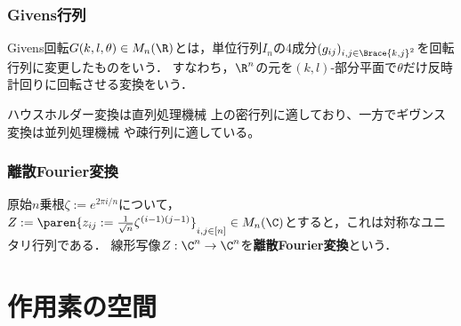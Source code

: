 \documentclass[uplatex, dvipdfmx]{jsreport}
\begin{document}
\subsection{Givens行列}

\begin{definition}
    Givens回転$G(k,l,\theta)\in M_n(\R)$とは，単位行列$I_n$の4成分$(g_{ij})_{i,j\in\Brace{k,j}^2}$を回転行列に変更したものをいう．
    すなわち，$\R^n$の元を$(k,l)$-部分平面で$\theta$だけ反時計回りに回転させる変換をいう．
\end{definition}
\begin{remarks}
    ハウスホルダー変換は直列処理機械
    上の密行列に適しており、一方でギヴンス変換は並列処理機械
    や疎行列に適している。
\end{remarks}

\subsection{離散Fourier変換}

\begin{definition}
    原始$n$乗根$\zeta:=e^{2\pi i/n}$について，$Z:=\paren{z_{ij}:=\frac{1}{\sqrt{n}}\zeta^{(i-1)(j-1)}}_{i,j\in[n]}\in M_n(\C)$とすると，これは対称なユニタリ行列である．
    線形写像$Z:\C^n\to\C^n$を\textbf{離散Fourier変換}という．
\end{definition}

\chapter{作用素の空間}
\end{document}
